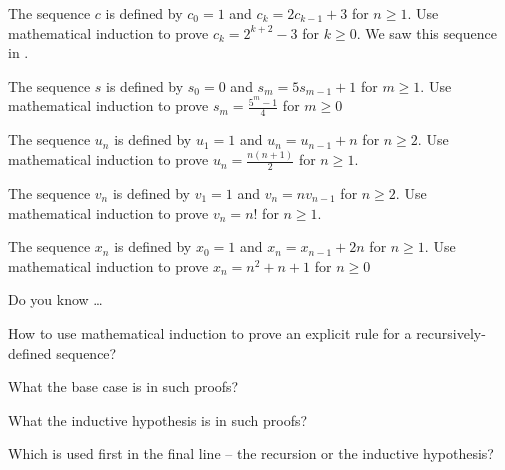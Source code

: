 \begin{exer}[\exerP] %
\label{exer_math_ind_exp}
    The sequence $c$ is defined by $c_0=1$ and $c_k = 2c_{k-1}+3$ for $n \ge 1$. Use mathematical induction to prove $c_k = 2^{k+2}-3$ for $k \ge 0$.  We saw this sequence in .
\end{exer}

\begin{exer}[\exerU] %
\label{exer_math_ind_frac}
    The sequence $s$ is defined by $s_0=0$ and $s_m = 5s_{m-1}+1$ for $m \ge 1$. Use mathematical induction to prove $s_m = \frac{5^m-1}{4}$ for $m \ge 0$
\end{exer}

\begin{exer}[\exerU] %
\label{exer_math_ind_hs}
    The sequence $u_n$ is defined by $u_1= 1$ and $u_n = u_{n-1}+n$ for $n \ge 2$. Use mathematical induction to prove $u_n =  \frac{n(n+1)}{2}$ for $n \ge 1$.
\end{exer}

\begin{exer}[\exerU] %
\label{exer_math_ind_factorial}
    The sequence $v_n$ is defined by $v_1= 1$ and $v_n = nv_{n-1}$ for $n \ge 2$. Use mathematical induction to prove $v_n = n!$ for $n \ge 1$.
\end{exer}

\begin{exer}[\exerU] %
\label{exer_math_ind_quadratic}
    The sequence $x_n$ is defined by $x_0=1$ and $x_n = x_{n-1}+2n$ for $n\ge 1$. Use mathematical induction to prove $x_n =n^2 + n + 1$ for $n \ge 0$
\end{exer}

\begin{exer}[\exerR] %
\label{exer_dyk_verify_explicit_induction}
    Do you know \ldots
        \begin{exerpart}
            \item How to use mathematical induction to prove an explicit rule for a recursively-defined sequence?
            \item What the base case is in such proofs?
            \item What the inductive hypothesis is in such proofs?
            \item Which is used first in the final line -- the recursion or the inductive hypothesis?
        \end{exerpart}
\end{exer}

